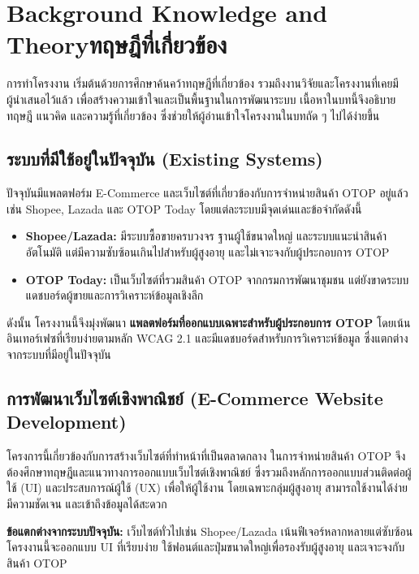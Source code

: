 \chapter{\ifenglish Background Knowledge and Theory\else ทฤษฎีที่เกี่ยวข้อง\fi}

การทำโครงงาน เริ่มต้นด้วยการศึกษาค้นคว้าทฤษฎีที่เกี่ยวข้อง 
รวมถึงงานวิจัยและโครงงานที่เคยมีผู้นำเสนอไว้แล้ว 
เพื่อสร้างความเข้าใจและเป็นพื้นฐานในการพัฒนาระบบ 
เนื้อหาในบทนี้จึงอธิบายทฤษฎี แนวคิด และความรู้ที่เกี่ยวข้อง \cite{pressman2014}
ซึ่งช่วยให้ผู้อ่านเข้าใจโครงงานในบทถัด ๆ ไปได้ง่ายขึ้น

\section{ระบบที่มีใช้อยู่ในปัจจุบัน (Existing Systems)}
ปัจจุบันมีแพลตฟอร์ม E-Commerce และเว็บไซต์ที่เกี่ยวข้องกับการจำหน่ายสินค้า OTOP อยู่แล้ว 
เช่น Shopee, Lazada และ OTOP Today โดยแต่ละระบบมีจุดเด่นและข้อจำกัดดังนี้

\begin{itemize}
    \item \textbf{Shopee/Lazada:} 
    มีระบบซื้อขายครบวงจร ฐานผู้ใช้ขนาดใหญ่ และระบบแนะนำสินค้าอัตโนมัติ 
    แต่มีความซับซ้อนเกินไปสำหรับผู้สูงอายุ และไม่เจาะจงกับผู้ประกอบการ OTOP
    \item \textbf{OTOP Today:} 
    เป็นเว็บไซต์ที่รวมสินค้า OTOP จากกรมการพัฒนาชุมชน 
    แต่ยังขาดระบบแดชบอร์ดผู้ขายและการวิเคราะห์ข้อมูลเชิงลึก
\end{itemize}

ดังนั้น โครงงานนี้จึงมุ่งพัฒนา \textbf{แพลตฟอร์มที่ออกแบบเฉพาะสำหรับผู้ประกอบการ OTOP} 
โดยเน้นอินเทอร์เฟซที่เรียบง่ายตามหลัก WCAG 2.1 และมีแดชบอร์ดสำหรับการวิเคราะห์ข้อมูล 
ซึ่งแตกต่างจากระบบที่มีอยู่ในปัจจุบัน

\section{การพัฒนาเว็บไซต์เชิงพาณิชย์ (E-Commerce Website Development)}
โครงการนี้เกี่ยวข้องกับการสร้างเว็บไซต์ที่ทำหน้าที่เป็นตลาดกลาง 
ในการจำหน่ายสินค้า OTOP จึงต้องศึกษาทฤษฎีและแนวทางการออกแบบเว็บไซต์เชิงพาณิชย์ \cite{ecommerce2019} 
ซึ่งรวมถึงหลักการออกแบบส่วนติดต่อผู้ใช้ (UI) และประสบการณ์ผู้ใช้ (UX) \cite{pressman2014} 
เพื่อให้ผู้ใช้งาน โดยเฉพาะกลุ่มผู้สูงอายุ สามารถใช้งานได้ง่าย 
มีความชัดเจน และเข้าถึงข้อมูลได้สะดวก

\textbf{ข้อแตกต่างจากระบบปัจจุบัน:}  
เว็บไซต์ทั่วไปเช่น Shopee/Lazada เน้นฟีเจอร์หลากหลายแต่ซับซ้อน 
โครงงานนี้จะออกแบบ UI ที่เรียบง่าย ใช้ฟอนต์และปุ่มขนาดใหญ่เพื่อรองรับผู้สูงอายุ 
และเจาะจงกับสินค้า OTOP

